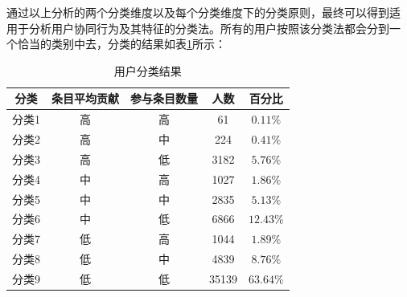 通过以上分析的两个分类维度以及每个分类维度下的分类原则，最终可以得到适
用于分析用户协同行为及其特征的分类法。所有的用户按照该分类法都会分到一
个恰当的类别中去，分类的结果如表\ref{tab:category}所示：
\begin{table}[htb]
  \centering
 \small
 \caption{\small{用户分类结果}}
  \begin{tabular}{|c|c|c|c|c|}
\hline
    分类&条目平均贡献&参与条目数量&人数&百分比\\\hline
    分类1&高&高&61&$0.11\%$\\\hline
    分类2&高&中&224&$0.41\%$\\\hline
    分类3&高&低&3182&$5.76\%$\\\hline
    分类4&中&高&1027&$1.86\%$\\\hline
    分类5&中&中&2835&$5.13\%$\\\hline
    分类6&中&低&6866&$12.43\%$\\\hline
    分类7&低&高&1044&$1.89\%$\\\hline
    分类8&低&中&4839&$8.76\%$\\\hline
    分类9&低&低&35139&$63.64\%$\\\hline
  \end{tabular}
 
  \label{tab:category}
\end{table}

